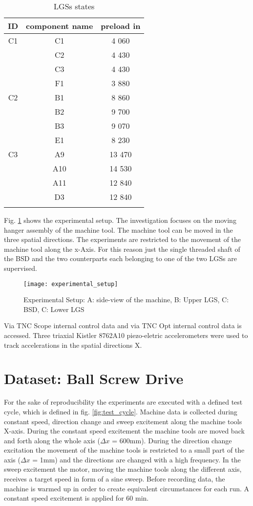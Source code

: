 \begin{center}
\begin{longtable}{||c c c||} 
 \hline
 ID & component name & preload in  \\ [0.5ex] 
 \hline\hline
 C1 & C1 & 4 060 \\ 
    & C2 & 4 430 \\ 
    & C3 & 4 430 \\
    & F1 & 3 880 \\ 
 \hline
 C2 & B1 & 8 860 \\ 
    & B2 & 9 700 \\ [1ex] 
    & B3 & 9 070 \\ [1ex]
    & E1 & 8 230 \\ [1ex]
 \hline
 C3 & A9 & 13 470 \\ 
    & A10 & 14 530 \\ [1ex] 
    & A11 & 12 840 \\ [1ex]
    & D3 & 12 840 \\ [1ex]
 \hline
\caption {LGSs states}
\label {tab:LGSs_states}
\end{longtable}
\end{center}

Fig. \ref{fig:experimental_setup} shows the experimental setup. The investigation focuses on the moving hanger assembly of the machine tool. The machine tool can be moved in the three spatial directions. The experiments are restricted to the movement of the machine tool along the x-Axis. For this reason just the single threaded shaft of the BSD and the two counterparts each belonging to one of the two LGSs are supervised.

\begin{figure}[H]
  \centering
  \texttt{[image: experimental\_setup]}
  \caption {Experimental Setup: A: side-view of the machine, B: Upper LGS, C: BSD, C: Lower LGS}
  \label{fig:experimental_setup}
\end{figure}


 Via TNC Scope internal control data and via TNC Opt internal control data is accessed. Three triaxial Kistler 8762A10 piezo-eletric accelerometers were used to track accelerations in the spatial directions X.

\section{Dataset: Ball Screw Drive}
For the sake of reproducibility the experiments are executed with a defined test cycle, which is defined in fig. \ref{fig:test_cycle}. Machine data is collected during constant speed, direction change and sweep excitement along the machine tools X-axis. During the constant speed excitement the machine tools are moved back and forth along the whole axis ($\Delta x$ = 600mm). During the direction change excitation the movement of the machine tools is restricted to a small part of the axis ($\Delta x$ = 1mm) and the directions are changed with a high frequency. In the sweep excitement the motor, moving the machine tools along the different axis, receives a target speed in form of a sine sweep. Before recording data, the machine is warmed up in order to create equivalent circumstances for each run. A constant speed excitement is applied for 60 min. 

